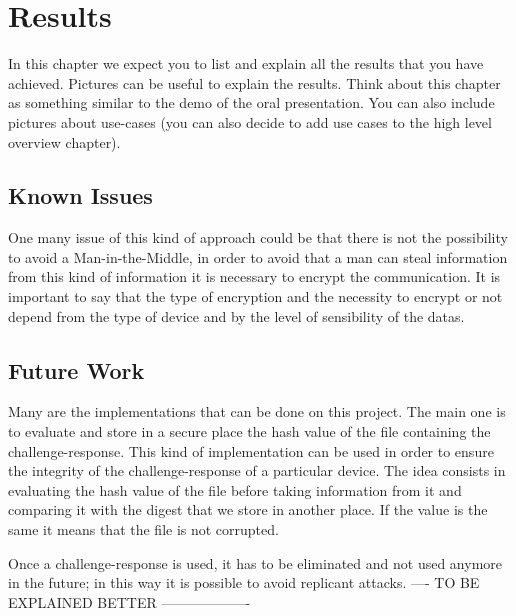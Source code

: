 \chapter{Results}
In this chapter we expect you to list and explain all the results that you have achieved. Pictures can be useful to explain the results. Think about this chapter as something similar to the demo of the oral presentation. You can also include pictures about use-cases (you can also decide to add use cases to the high level overview chapter).
\section{Known Issues}
One many issue of this kind of approach could be that there is not the possibility to avoid a Man-in-the-Middle, in order to avoid that a man can steal information from this kind of information it is necessary to encrypt the communication.
It is important to say that the type of encryption and the necessity to encrypt or not depend from the type of device and by the level of sensibility of the datas.


\section{Future Work}
Many are the implementations that can be done on this project.
The main one is to evaluate and store in a secure place the hash value of the file containing the challenge-response.
This kind of implementation can be used in order to ensure the integrity of the challenge-response of a particular device.
The idea consists in evaluating the hash value of the file before taking information from it and comparing it with the digest that we store in another place.
If the value is the same it means that the file is not corrupted.


Once a challenge-response is used, it has to be eliminated and not used anymore in the future; in this way it is possible to avoid replicant attacks.
---- TO BE EXPLAINED BETTER -------------------
